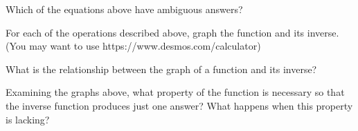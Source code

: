 \documentclass[number]{ximera}
\begin{document}
\begin{question}
Which of the equations above have ambiguous answers?
\begin{selectAll}
\end{selectAll}

\end{question}

\begin{question}
For each of the operations described above, graph the function and its inverse. (You may want to use https://www.desmos.com/calculator)

What is the relationship between the graph of a function and its inverse?
\begin{freeResponse}

\end{freeResponse}

\end{question}

\begin{question}
Examining the graphs above, what property of the function is necessary so that the inverse function produces just one answer? What happens when this property is lacking?
\begin{hint}

\end{hint}
\begin{freeResponse}

\end{freeResponse}

\end{question}
\end{document}
